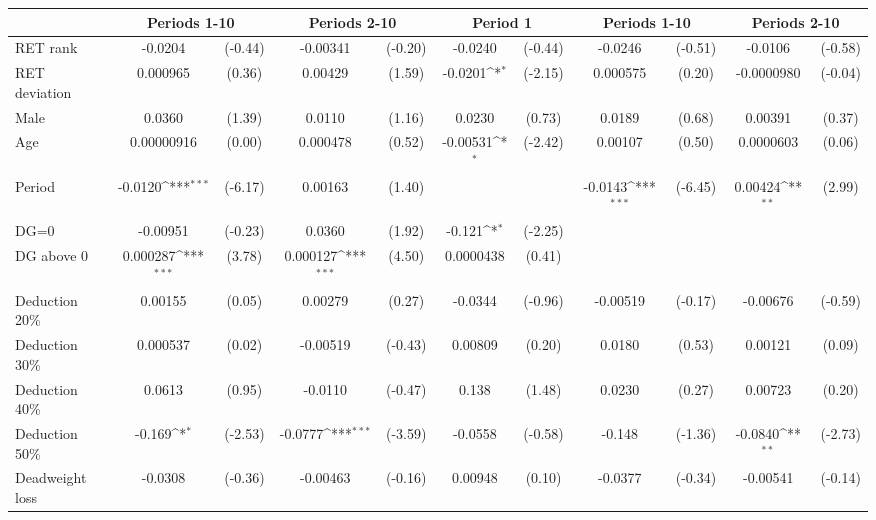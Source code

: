 {
\def\sym#1{\ifmmode^{#1}\else\(^{#1}\)\fi}
\begin{tabular}{l*{5}{cc}}
\hline\hline
                &\multicolumn{2}{c}{Periods 1-10}&\multicolumn{2}{c}{Periods 2-10}&\multicolumn{2}{c}{Period 1}&\multicolumn{2}{c}{Periods 1-10}&\multicolumn{2}{c}{Periods 2-10}\\
\hline
RET rank        &  -0.0204         &  (-0.44)& -0.00341         &  (-0.20)&  -0.0240         &  (-0.44)&  -0.0246         &  (-0.51)&  -0.0106         &  (-0.58)\\
RET deviation   & 0.000965         &   (0.36)&  0.00429         &   (1.59)&  -0.0201\sym{*}  &  (-2.15)& 0.000575         &   (0.20)&-0.0000980         &  (-0.04)\\
Male            &   0.0360         &   (1.39)&   0.0110         &   (1.16)&   0.0230         &   (0.73)&   0.0189         &   (0.68)&  0.00391         &   (0.37)\\
Age             &0.00000916         &   (0.00)& 0.000478         &   (0.52)& -0.00531\sym{*}  &  (-2.42)&  0.00107         &   (0.50)&0.0000603         &   (0.06)\\
Period          &  -0.0120\sym{***}&  (-6.17)&  0.00163         &   (1.40)&                  &         &  -0.0143\sym{***}&  (-6.45)&  0.00424\sym{**} &   (2.99)\\
DG=0            & -0.00951         &  (-0.23)&   0.0360         &   (1.92)&   -0.121\sym{*}  &  (-2.25)&                  &         &                  &         \\
DG above 0      & 0.000287\sym{***}&   (3.78)& 0.000127\sym{***}&   (4.50)&0.0000438         &   (0.41)&                  &         &                  &         \\
Deduction 20\%  &  0.00155         &   (0.05)&  0.00279         &   (0.27)&  -0.0344         &  (-0.96)& -0.00519         &  (-0.17)& -0.00676         &  (-0.59)\\
Deduction 30\%  & 0.000537         &   (0.02)& -0.00519         &  (-0.43)&  0.00809         &   (0.20)&   0.0180         &   (0.53)&  0.00121         &   (0.09)\\
Deduction 40\%  &   0.0613         &   (0.95)&  -0.0110         &  (-0.47)&    0.138         &   (1.48)&   0.0230         &   (0.27)&  0.00723         &   (0.20)\\
Deduction 50\%  &   -0.169\sym{*}  &  (-2.53)&  -0.0777\sym{***}&  (-3.59)&  -0.0558         &  (-0.58)&   -0.148         &  (-1.36)&  -0.0840\sym{**} &  (-2.73)\\
Deadweight loss &  -0.0308         &  (-0.36)& -0.00463         &  (-0.16)&  0.00948         &   (0.10)&  -0.0377         &  (-0.34)& -0.00541         &  (-0.14)\\

\end{tabular}}
